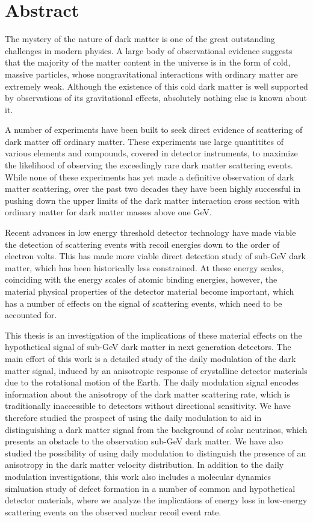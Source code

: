 \documentclass[b5paper, 10pt, twoside]{book}
\begin{document}
\tableofcontents

\chapter{Abstract}

The mystery of the nature of dark matter is one of the great outstanding challenges in modern physics. A large body of observational evidence suggests that the majority of the matter content in the universe is in the form of cold, massive particles, whose nongravitational interactions with ordinary matter are extremely weak. Although the existence of this cold dark matter is well supported by observations of its gravitational effects, absolutely nothing else is known about it.

A number of experiments have been built to seek direct evidence of scattering of dark matter off ordinary matter. These experiments use large quantitites of various elements and compounds, covered in detector instruments, to maximize the likelihood of observing the exceedingly rare dark matter scattering events. While none of these experiments has yet made a definitive observation of dark matter scattering, over the past two decades they have been highly successful in pushing down the upper limits of the dark matter interaction cross section with ordinary matter for dark matter masses above one GeV.

Recent advances in low energy threshold detector technology have made viable the detection of scattering events with recoil energies down to the order of electron volts. This has made more viable direct detection study of sub-GeV dark matter, which has been historically less constrained. At these energy scales, coinciding with the energy scales of atomic binding energies, however, the material physical properties of the detector material become important, which has a number of effects on the signal of scattering events, which need to be accounted for.

This thesis is an investigation of the implications of these material effects on the hypothetical signal of sub-GeV dark matter in next generation detectors. The main effort of this work is a detailed study of the daily modulation of the dark matter signal, induced by an anisotropic response of crystalline detector materials due to the rotational motion of the Earth. The daily modulation signal encodes information about the anisotropy of the dark matter scattering rate, which is traditionally inaccessible to detectors without directional sensitivity. We have therefore studied the prospect of using the daily modulation to aid in distinguishing a dark matter signal from the background of solar neutrinos, which presents an obstacle to the observation sub-GeV dark matter. We have also studied the possibility of using daily modulation to distinguish the presence of an anisotropy in the dark matter velocity distribution. In addition to the daily modulation investigations, this work also includes a molecular dynamics simluation study of defect formation in a number of common and hypothetical detector materials, where we analyze the implications of energy loss in low-energy scattering events on the observed nuclear recoil event rate.
\end{document}
